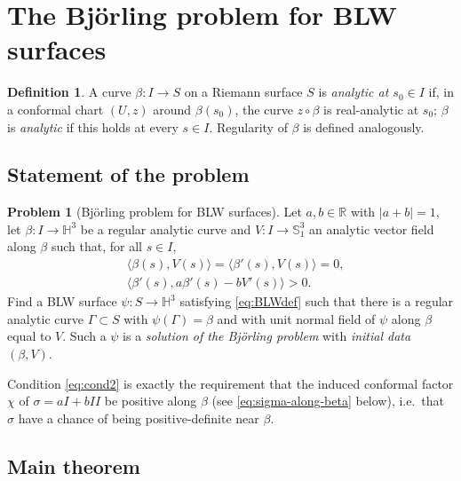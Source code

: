 \documentclass[11pt,a4paper]{article}
\newcommand{\RR}{\mathbb{R}}
\newcommand{\Hyp}{\mathbb{H}^3}                      %
\newcommand{\deS}{\mathbb{S}^3_1}                    %
\newcommand{\ip}[2]{\langle #1,#2\rangle}            %
\theoremstyle{plain}
\theoremstyle{definition}
\newtheorem{definition}[theorem]{Definition}
\newtheorem{problem}[theorem]{Problem}
\theoremstyle{remark}
\begin{document}
\section{The Björling problem for BLW surfaces}\label{sec:BJ}

\begin{definition}\label{def:analyticcurve}
A curve $\beta:I\to S$ on a Riemann surface $S$ is \emph{analytic at
$s_0\in I$} if, in a conformal chart $(U,z)$ around $\beta(s_0)$, the
curve $z\circ\beta$ is real-analytic at $s_0$; $\beta$ is \emph{analytic}
if this holds at every $s\in I$. Regularity of $\beta$ is defined
analogously.
\end{definition}

\subsection{Statement of the problem}\label{ssec:statement}

\begin{problem}[Björling problem for BLW surfaces]\label{prob:BJ}
Let $a,b\in\RR$ with $|a+b|=1$, let $\beta:I\to\Hyp$ be a regular
analytic curve and $V:I\to\deS$ an analytic vector field along $\beta$
such that, for all $s\in I$,
\begin{align}
  &\ip{\beta(s)}{V(s)} = \ip{\beta'(s)}{V(s)} = 0, \label{eq:cond1}\\
  &\ip{\beta'(s)}{a\beta'(s)-bV'(s)} > 0. \label{eq:cond2}
\end{align}
Find a BLW surface $\psi:S\to\Hyp$ satisfying \eqref{eq:BLWdef} such that
there is a regular analytic curve $\Gamma\subset S$ with $\psi(\Gamma)=\beta$
and with unit normal field of $\psi$ along $\beta$ equal to $V$. Such a
$\psi$ is a \emph{solution of the Björling problem} with \emph{initial
data} $(\beta,V)$.
\end{problem}

Condition \eqref{eq:cond2} is exactly the requirement that the induced
conformal factor $\chi$ of $\sigma=aI+bI\!I$ be positive along $\beta$
(see \eqref{eq:sigma-along-beta} below), i.e.\ that $\sigma$ have a chance
of being positive-definite near $\beta$.

\subsection{Main theorem}
\end{document}
